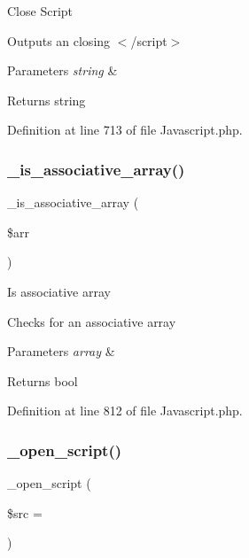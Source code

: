Close Script

Outputs an closing $<$/script$>$


\begin{DoxyParams}{Parameters}
{\em string} & \\
\hline
\end{DoxyParams}
\begin{DoxyReturn}{Returns}
string 
\end{DoxyReturn}


Definition at line 713 of file Javascript.\+php.

\mbox{\label{class_c_i___javascript_aa37c9b1b7e2898fe21a0deaace09b156}} 
\subsubsection{\texorpdfstring{\_is\_associative\_array()}{\_is\_associative\_array()}}
{\footnotesize\ttfamily \+\_\+is\+\_\+associative\+\_\+array (\begin{DoxyParamCaption}\item[{}]{\$arr }\end{DoxyParamCaption})\hspace{0.3cm}{\ttfamily [protected]}}

Is associative array

Checks for an associative array


\begin{DoxyParams}{Parameters}
{\em array} & \\
\hline
\end{DoxyParams}
\begin{DoxyReturn}{Returns}
bool 
\end{DoxyReturn}


Definition at line 812 of file Javascript.\+php.

\mbox{\label{class_c_i___javascript_ab90b7bf672ff305aa302ced7c8255762}} 
\subsubsection{\texorpdfstring{\_open\_script()}{\_open\_script()}}
{\footnotesize\ttfamily \+\_\+open\+\_\+script (\begin{DoxyParamCaption}\item[{}]{\$src = {\ttfamily \textquotesingle{}\textquotesingle{}} }\end{DoxyParamCaption})\hspace{0.3cm}{\ttfamily [protected]}}

